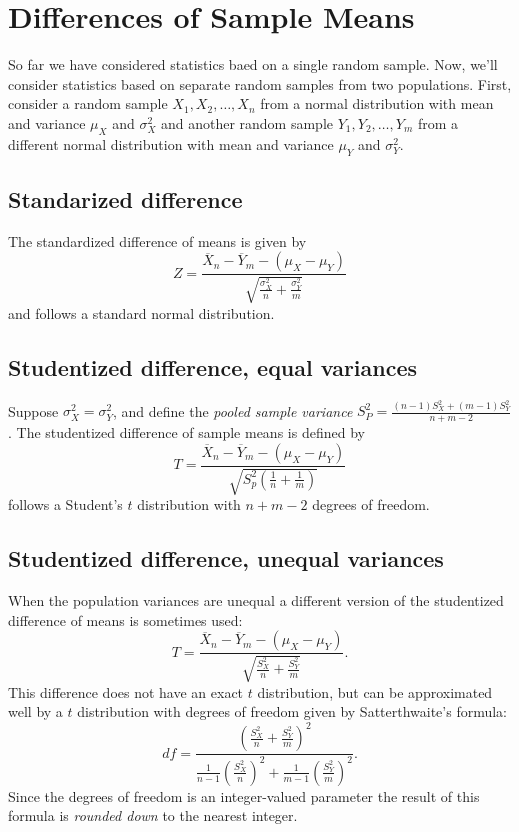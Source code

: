 \documentclass[
]{book}
\begin{document}
\hypertarget{differences-of-sample-means}{%
\section{Differences of Sample Means}\label{differences-of-sample-means}}

So far we have considered statistics baed on a single random sample. Now, we'll consider statistics based on separate random samples from two populations. First, consider a random sample \(X_1, X_2, \ldots, X_{n}\) from a normal distribution with mean and variance \(\mu_X\) and \(\sigma_X^2\) and another random sample \(Y_1, Y_2, \ldots, Y_m\) from a different normal distribution with mean and variance \(\mu_Y\) and \(\sigma_Y^2\).

\hypertarget{standarized-difference}{%
\subsection{Standarized difference}\label{standarized-difference}}

The standardized difference of means is given by
\[Z = \frac{\overline X_n - \overline Y_m - (\mu_X - \mu_Y)}{\sqrt{\frac{\sigma_X^2}{n} + \frac{\sigma_Y^2}{m}}}\]
and follows a standard normal distribution.

\hypertarget{studentized-difference-equal-variances}{%
\subsection{Studentized difference, equal variances}\label{studentized-difference-equal-variances}}

Suppose \(\sigma_X^2 = \sigma_Y^2\), and define the \emph{pooled sample variance} \(S_P^2 = \frac{(n-1)S_X^2 + (m-1)S_Y^2}{n+m-2}\). The studentized difference of sample means is defined by
\[T = \frac{\overline X_n - \overline Y_m - (\mu_X - \mu_Y)}{\sqrt{S_p^2(\frac{1}{n}+\frac{1}{m})}}\]
follows a Student's \(t\) distribution with \(n+m - 2\) degrees of freedom.

\hypertarget{studentized-difference-unequal-variances}{%
\subsection{Studentized difference, unequal variances}\label{studentized-difference-unequal-variances}}

When the population variances are unequal a different version of the studentized difference of means is sometimes used:
\[T = \frac{\overline X_n - \overline Y_m - (\mu_X - \mu_Y)}{\sqrt{\frac{S_X^2}{n}+\frac{S_Y^2}{m}}}.\]
This difference does not have an exact \(t\) distribution, but can be approximated well by a \(t\) distribution with degrees of freedom given by Satterthwaite's formula:
\[df = \frac{\left(\frac{S_X^2}{n}+\frac{S_Y^2}{m}\right)^2}{\frac{1}{n-1}\left(\frac{S_X^2}{n}\right)^2 + \frac{1}{m-1}\left(\frac{S_Y^2}{m}\right)^2}.\]
Since the degrees of freedom is an integer-valued parameter the result of this formula is \emph{rounded down} to the nearest integer.
\end{document}
